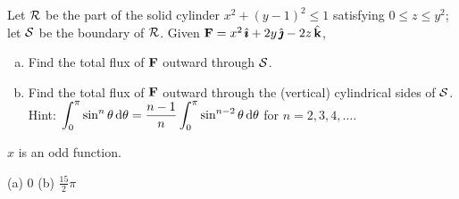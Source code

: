 \begin{question}[M317 2000D] %
Let $\mathcal{R}$ be the part of the solid cylinder $x^2 + (y-1)^2 \le 1$
satisfying $0\le z \le y^2$; 
let $\mathcal{S}$ be the boundary of $\mathcal{R}$.
Given $\mathbf{F} = x^2\,\hat{\pmb{\imath}} + 2y\,\hat{\pmb{\jmath}} - 2z\,\hat{\mathbf{k}}$,
\begin{enumerate}[(a)]
\item
Find the total flux of $\mathbf{F}$ outward through $\mathcal{S}$.
\item
Find the total flux of $\mathbf{F}$ outward through the (vertical)
cylindrical sides of $\mathcal{S}$.
\hfill\break
Hint: $\displaystyle \int_0^\pi \sin^{n}\theta\,\mathrm{d}\theta
= \frac{n-1}{ n}\int_0^\pi \sin^{n-2}\theta\,\mathrm{d}\theta$
for $n=2,3,4,\ldots$.
\end{enumerate}

\end{question}

\begin{hint} 
$x$ is an odd function.
\end{hint}

\begin{answer} 
(a) $0$\qquad
(b) $\frac{15}{2}\pi$
\end{answer}

